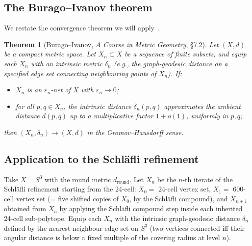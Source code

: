 \documentclass[12pt]{article}
\newtheorem{theorem}{Theorem}
\theoremstyle{definition}
\theoremstyle{remark}
\begin{document}
\subsection{The Burago--Ivanov theorem}

We restate the convergence theorem we will apply~\citep{BBI2001}.

\begin{theorem}[Burago--Ivanov, \emph{A Course in Metric Geometry}, \S7.2]\label{thm:BI}
Let $(X, d)$ be a compact metric space. Let $X_n \subset X$ be a sequence of finite subsets, and equip each $X_n$ with an \emph{intrinsic} metric $\delta_n$ (e.g., the graph-geodesic distance on a specified edge set connecting neighbouring points of $X_n$). If:
\begin{itemize}
\item[\textup{(BI1)}] $X_n$ is an $\varepsilon_n$-net of $X$ with $\varepsilon_n \to 0$;
\item[\textup{(BI2)}] for all $p, q \in X_n$, the intrinsic distance $\delta_n(p, q)$ approximates the ambient distance $d(p, q)$ up to a multiplicative factor $1 + o(1)$, uniformly in $p, q$;
\end{itemize}
then $(X_n, \delta_n) \to (X, d)$ in the Gromov--Hausdorff sense.
\end{theorem}

\subsection{Application to the Schl\"afli refinement}

Take $X = S^3$ with the round metric $d_{\mathrm{round}}$. Let $X_n$ be the $n$-th iterate of the Schl\"afli refinement starting from the 24-cell: $X_0 = $ 24-cell vertex set, $X_1 = $ 600-cell vertex set (= five shifted copies of $X_0$, by the Schl\"afli compound), and $X_{n+1}$ obtained from $X_n$ by applying the Schl\"afli compound step inside each inherited 24-cell sub-polytope. Equip each $X_n$ with the intrinsic graph-geodesic distance $\delta_n$ defined by the nearest-neighbour edge set on $S^3$ (two vertices connected iff their angular distance is below a fixed multiple of the covering radius at level $n$).
\end{document}
